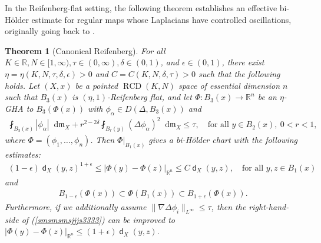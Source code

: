 \documentclass[11pt,reqno]{amsart}
\newtheorem{theorem}{Theorem}[section]
\theoremstyle{definition}
\numberwithin{equation}{section}
\newcommand{\di}{\mathop{}\!\mathrm{d}}
\newcommand{\meas}{\mathfrak{m}}
\DeclareMathOperator{\dist}{\mathsf{d}}
\DeclareMathOperator{\RCD}{RCD}
\begin{document}
 

In the Reifenberg-flat setting, the following theorem establishes an effective bi-H\"older estimate for regular maps whose Laplacians have controlled oscillations, originally going back to \cite{CJN}. 

\begin{theorem}[Canonical Reifenberg]\label{8as8ashas8ashsbasb}
For all $K \in \mathbb{R}, N \in [1, \infty), \tau \in (0, \infty), \delta \in (0,1)$, and $\epsilon \in (0,1)$, there exist $\eta = \eta (K, N, \tau, \delta, \epsilon) > 0$ and $C=C(K, N, \delta, \tau) > 0$ such that the following holds. Let $(X, x)$ be a pointed $\RCD(K, N)$ space of essential dimension $n$ such that $B_3(x)$ is $(\eta, 1)$-Reifenberg flat, and let $\Phi:B_3(x) \to \mathbb{R}^n$  be an $\eta$-GHA to $B_3(\Phi(x))$ with $\phi_{\alpha} \in D(\Delta, B_3(x))$  and 
    \begin{align}
        \fint_{B_3(x)}|\phi_{\alpha}|\di \meas_X+r^{2-2 \delta}\fint_{B_r(y)}(\Delta \phi_{\alpha})^2\di \meas_X \le \tau,\quad \text{for all $y \in B_2(x), \ 0<r<1$},
    \end{align}
where $\Phi=(\phi_1, \ldots, \phi_n)$. Then $\Phi|_{B_1(x)}$ gives a bi-H\"older chart with 
    the following estimates: \begin{align}\label{smsmsmsjjjs3333}
        (1-\epsilon)\dist_X(y,z)^{1+\epsilon} \le |\Phi(y)-\Phi(z)|_{\mathbb{R}^n} \le C\dist_X(y,z),\quad \text{for all $y, z \in B_1(x)$}
    \end{align}
and
\begin{align}\label{asoaisriasoransrsk}
        B_{1-\epsilon}(\Phi(x))\subset \Phi(B_1(x)) \subset B_{1+\epsilon}(\Phi(x)).
    \end{align}
Furthermore, if we additionally assume $\|\nabla \Delta \phi_i\|_{L^{\infty}} \le \tau$, then the right-hand-side of (\ref{smsmsmsjjjs3333}) can be improved to 
$
    \left| \Phi(y)-\Phi(z)\right|_{\mathbb{R}^n}  \le \left(1+\epsilon \right)\dist_X(y,z).
$
\end{theorem}
\end{document}
